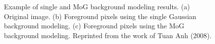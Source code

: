 \begin{figure}[t]
  \centering
  \hspace{0.1in}
  \hspace{0.1in}
  \caption[Example of single and MoG background modeling results.]
  {Example of single and MoG background modeling results. (a) Original
  image. (b) Foreground pixels using the single Gaussian background
  modeling. (c) Foreground pixels using the MoG background
  modeling. Reprinted from the work of Tuan Anh (2008).}
  \label{fig:bck-model-results}
\end{figure}

